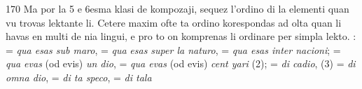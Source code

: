 \begin{VUpage}[174]{170}
Ma por la 5 e 6esma klasi de kompozaji, sequez l'ordino di\nl
la elementi quan vu trovas lektante li. Cetere maxim ofte ta\nl
ordino korespondas ad olta quan li havas en multi de nia\nl
lingui, e pro to on komprenas li ordinare per simpla lekto.\nl
{} :  = \textit{qua esas sub maro},  = \textit{qua}\nl
\textit{esas super la naturo},  = \textit{qua esas inter nacioni};\nl
{} = \textit{qua evas} (od evis) \textit{un dio},  = \textit{qua evas}\nl
(od evis) \textit{cent yari} (2);  = \textit{di cadio},  (3) =\nl
\textit{di omna dio},  = \textit{di ta speco},  = \textit{di tala}\nl
\end{VUpage}

